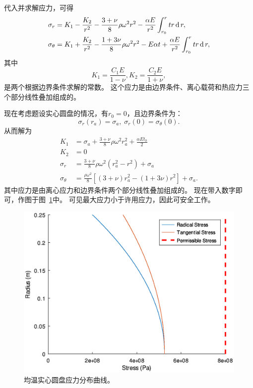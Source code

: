 代入并求解应力，可得
\begin{equation}
    \begin{aligned}
        \sigma_r &= K_1 - \frac{K_2}{r^2} -\frac{3+\nu}{8} \rho \omega^2 r^2 - \frac{\alpha E}{r^2} \int_{r_0}^r tr \operatorname{\mathop{} \! \mathrm{d}} r, \\
        \sigma_\theta & = K_1 + \frac{K_2}{r^2} -\frac{1+3\nu}{8} \rho \omega^2 r^2  - E \alpha t + \frac{\alpha E}{r^2} \int_{r_0}^r tr \operatorname{\mathop{} \! \mathrm{d}} r,
    \end{aligned}
    \label{equ:uniform-disk-stress}
\end{equation}
其中
\begin{equation}
    K_1 = \frac{C_1 E}{1-\nu}, K_2 = \frac{C_2 E}{1 + \nu},
\end{equation}
是两个根据边界条件求解的常数。
这个应力是由边界条件、离心载荷和热应力三个部分线性叠加组成的。

现在考虑题设实心圆盘的情况，有$r_0 = 0$，且边界条件为：
\begin{equation}
    \sigma_r (r_a) = \sigma_a,\; \sigma_r(0) = \sigma_\theta(0).
\end{equation}
从而解为
\begin{equation}
    \begin{aligned}
        K_1 & = \sigma_a + \frac{3+\nu}{8} \rho \omega^2 r_a^2 + \frac{\alpha E t_0}{2} \\
        K_2 & = 0 \\
        \sigma_r & = \frac{3 + \nu}{8} \rho \omega^2 (r_a^2 - r^2) + \sigma_a \\
        \sigma_\theta &= \frac{\rho \omega^2}{8} [(3+\nu) r_a^2 - (1+3\nu)r^2] + \sigma_a.
    \end{aligned}
\end{equation}
其中应力是由离心应力和边界条件两个部分线性叠加组成的。
现在带入数字即可，作图于图~\ref{fig:part-2-question-1}中。
可见最大应力小于许用应力，因此可安全工作。

\begin{figure}[!t]
    \centering
    \includegraphics[width=0.8\linewidth]{part-2-question-1.eps}
    \caption{均温实心圆盘应力分布曲线。}
    \label{fig:part-2-question-1}
\end{figure}

